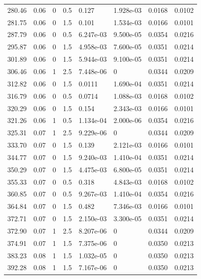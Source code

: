 \documentclass[preview]{standalone}
\begin{document}
{{{\begin{tabular}{L{1.2cm}C{1.2cm} C{0.3cm}C{0.5cm} C{1.4cm}C{1.4cm} C{1.4cm}C{1.4cm}}
  280.46  &  0.06  & 0     & 0.5 &  0.127  & 1.928e-03  & 0.0168 &  0.0102   \\ 
  281.75  &  0.06  & 0     & 1.5 &  0.101  & 1.534e-03  & 0.0166 &  0.0101   \\ 
  287.79  &  0.06  & 0     & 0.5 &  6.247e-03  & 9.500e-05  & 0.0354 &  0.0216   \\ 
  295.87  &  0.06  & 0     & 1.5 &  4.958e-03  & 7.600e-05  & 0.0351 &  0.0214   \\ 
  301.89  &  0.06  & 0     & 1.5 &  5.944e-03  & 9.100e-05  & 0.0351 &  0.0214   \\ 
  306.46  &  0.06  & 1     & 2.5 &  7.448e-06  & 0  & 0.0344 &  0.0209   \\ 
  312.82  &  0.06  & 0     & 1.5 &  0.0111  & 1.690e-04  & 0.0351 &  0.0214   \\ 
  316.79  &  0.06  & 0     & 0.5 &  0.0714  & 1.088e-03  & 0.0168 &  0.0102   \\ 
  320.29  &  0.06  & 0     & 1.5 &  0.154  & 2.343e-03  & 0.0166 &  0.0101   \\ 
  321.26  &  0.06  & 1     & 0.5 &  1.134e-04  & 2.000e-06  & 0.0354 &  0.0216   \\ 
  325.31  &  0.07  & 1     & 2.5 &  9.229e-06  & 0  & 0.0344 &  0.0209   \\ 
  333.70  &  0.07  & 0     & 1.5 &  0.139  & 2.121e-03  & 0.0166 &  0.0101   \\ 
  344.77  &  0.07  & 0     & 1.5 &  9.240e-03  & 1.410e-04  & 0.0351 &  0.0214   \\ 
  350.29  &  0.07  & 0     & 1.5 &  4.475e-03  & 6.800e-05  & 0.0351 &  0.0214   \\ 
  355.33  &  0.07  & 0     & 0.5 &  0.318  & 4.843e-03  & 0.0168 &  0.0102   \\ 
  360.85  &  0.07  & 0     & 0.5 &  9.267e-03  & 1.410e-04  & 0.0354 &  0.0216   \\ 
  364.84  &  0.07  & 0     & 1.5 &  0.482  & 7.346e-03  & 0.0166 &  0.0101   \\ 
  372.71  &  0.07  & 0     & 1.5 &  2.150e-03  & 3.300e-05  & 0.0351 &  0.0214   \\ 
  372.90  &  0.07  & 1     & 2.5 &  8.207e-06  & 0  & 0.0344 &  0.0209   \\ 
  374.91  &  0.07  & 1     & 1.5 &  7.375e-06  & 0  & 0.0350 &  0.0213   \\ 
  383.23  &  0.08  & 1     & 1.5 &  1.032e-05  & 0  & 0.0350 &  0.0213   \\ 
  392.28  &  0.08  & 1     & 1.5 &  7.167e-06  & 0  & 0.0350 &  0.0213   \\ 

\end{tabular}}}}
\end{document}
